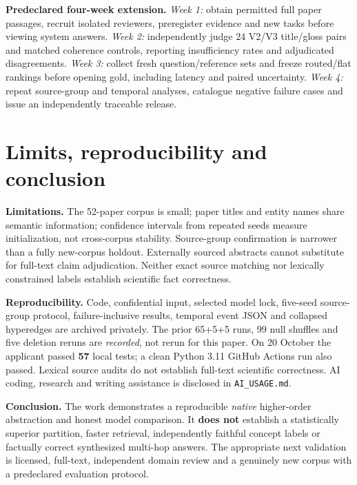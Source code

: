 \documentclass[10pt,twocolumn]{article}
\begin{document}
\textbf{Predeclared four-week extension.}
\emph{Week 1:} obtain permitted full paper passages, recruit isolated reviewers, preregister evidence and new tasks before viewing system answers.
\emph{Week 2:} independently judge 24 V2/V3 title/gloss pairs and matched coherence controls, reporting insufficiency rates and adjudicated disagreements.
\emph{Week 3:} collect fresh question/reference sets and freeze routed/flat rankings before opening gold, including latency and paired uncertainty.
\emph{Week 4:} repeat source-group and temporal analyses, catalogue negative failure cases and issue an independently traceable release.

\section{Limits, reproducibility and conclusion}
\textbf{Limitations.} The 52-paper corpus is small; paper titles and entity names share semantic information; confidence intervals from repeated seeds measure initialization, not cross-corpus stability. Source-group confirmation is narrower than a fully new-corpus holdout. Externally sourced abstracts cannot substitute for full-text claim adjudication. Neither exact source matching nor lexically constrained labels establish scientific fact correctness.

\textbf{Reproducibility.} Code, confidential input, selected model lock, five-seed source-group protocol, failure-inclusive results, temporal event JSON and collapsed hyperedges are archived privately. The prior 65+5+5 runs, 99 null shuffles and five deletion reruns are \emph{recorded}, not rerun for this paper. On 20 October the applicant passed \textbf{57} local tests; a clean Python 3.11 GitHub Actions run also passed. Lexical source audits do not establish full-text scientific correctness. AI coding, research and writing assistance is disclosed in \texttt{AI\_USAGE.md}.

\textbf{Conclusion.} The work demonstrates a reproducible \emph{native} higher-order abstraction and honest model comparison. It \textbf{does not} establish a statistically superior partition, faster retrieval, independently faithful concept labels or factually correct synthesized multi-hop answers. The appropriate next validation is licensed, full-text, independent domain review and a genuinely new corpus with a predeclared evaluation protocol.
\end{document}
